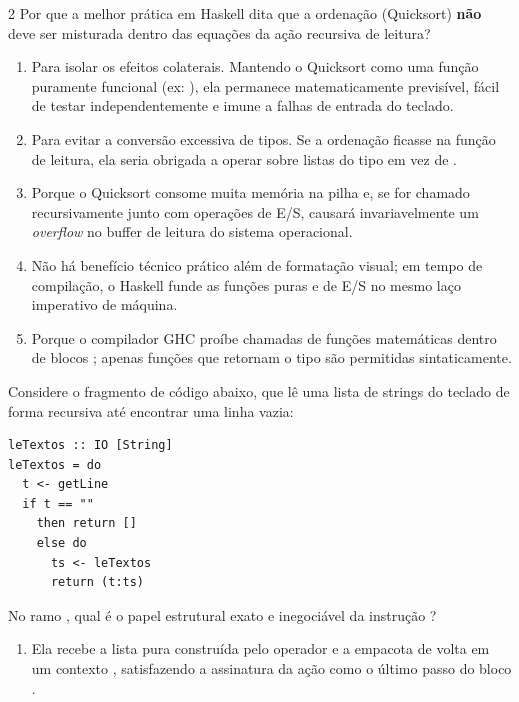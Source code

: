 \documentclass[a4paper,10pt,brazil]{article}
\begin{document}
\begin{multicols}{2}
Por que a melhor prática em Haskell dita que a ordenação (Quicksort) \textbf{não} deve ser misturada dentro das equações da ação recursiva de leitura?

\begin{enumerate}
  \item Para isolar os efeitos colaterais. Mantendo o Quicksort como uma função puramente funcional (ex: \haskellinline{[Int] -> [Int]}), ela permanece matematicamente previsível, fácil de testar independentemente e imune a falhas de entrada do teclado.

  \item Para evitar a conversão excessiva de tipos. Se a ordenação ficasse na função de leitura, ela seria obrigada a operar sobre listas do tipo \haskellinline{[IO Int]} em vez de \haskellinline{[Int]}.

  \item Porque o Quicksort consome muita memória na pilha e, se for chamado recursivamente junto com operações de E/S, causará invariavelmente um \emph{overflow} no buffer de leitura do sistema operacional.

  \item Não há benefício técnico prático além de formatação visual; em tempo de compilação, o Haskell funde as funções puras e de E/S no mesmo laço imperativo de máquina.

  \item Porque o compilador GHC proíbe chamadas de funções matemáticas dentro de blocos ; apenas funções que retornam o tipo  são permitidas sintaticamente.


\end{enumerate}

Considere o fragmento de código abaixo, que lê uma lista de strings do teclado de forma recursiva até encontrar uma linha vazia:

\begin{verbatim}
leTextos :: IO [String]
leTextos = do
  t <- getLine
  if t == "" 
    then return []
    else do
      ts <- leTextos
      return (t:ts)
\end{verbatim}

No ramo , qual é o papel estrutural exato e inegociável da instrução ?

\begin{enumerate}
  \item Ela recebe a lista pura construída pelo operador \haskellinline{(:)} e a empacota de volta em um contexto , satisfazendo a assinatura da ação como o último passo do bloco .


\end{enumerate}
\end{multicols}
\end{document}
